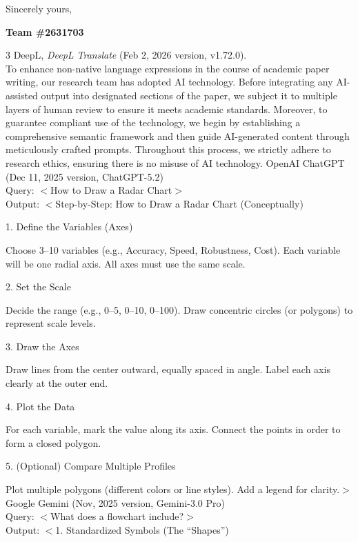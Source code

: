 \documentclass{mcmthesis}
\begin{document}
\vspace{1.5cm}                    %

\hfill Sincerely yours,           %

\hfill {\bf Team \#2631703}     


\newpage
{}
\AImatter
\begin{ReportAiUse}{3}
DeepL, \textit{DeepL Translate} (Feb 2, 2026 version, v1.72.0).\\
To enhance non-native language expressions in the course of academic paper writing, our research team has adopted AI technology. Before integrating any AI-assisted output into designated sections of the paper, we subject it to multiple layers of human review to ensure it meets academic standards. Moreover, to guarantee compliant use of the technology, we begin by establishing a comprehensive semantic framework and then guide AI-generated content through meticulously crafted prompts. Throughout this process, we strictly adhere to research ethics, ensuring there is no misuse of AI technology.
OpenAI ChatGPT (Dec 11, 2025 version, ChatGPT-5.2)\\
Query: $<$How to Draw a Radar Chart$>$\\
Output: $<$Step-by-Step: How to Draw a Radar Chart (Conceptually)

1. Define the Variables (Axes)

Choose 3--10 variables (e.g., Accuracy, Speed, Robustness, Cost). Each variable will be one radial axis. All axes must use the same scale.

2. Set the Scale

Decide the range (e.g., 0--5, 0--10, 0--100). Draw concentric circles (or polygons) to represent scale levels.

3. Draw the Axes

Draw lines from the center outward, equally spaced in angle. Label each axis clearly at the outer end.

4. Plot the Data

For each variable, mark the value along its axis. Connect the points in order to form a closed polygon.

5. (Optional) Compare Multiple Profiles

Plot multiple polygons (different colors or line styles). Add a legend for clarity.$>$\\

Google Gemini (Nov, 2025 version, Gemini-3.0 Pro)\\
Query: $<$What does a flowchart include?$>$\\
Output: $<$1. Standardized Symbols (The ``Shapes'')


\end{ReportAiUse}
\end{document}
